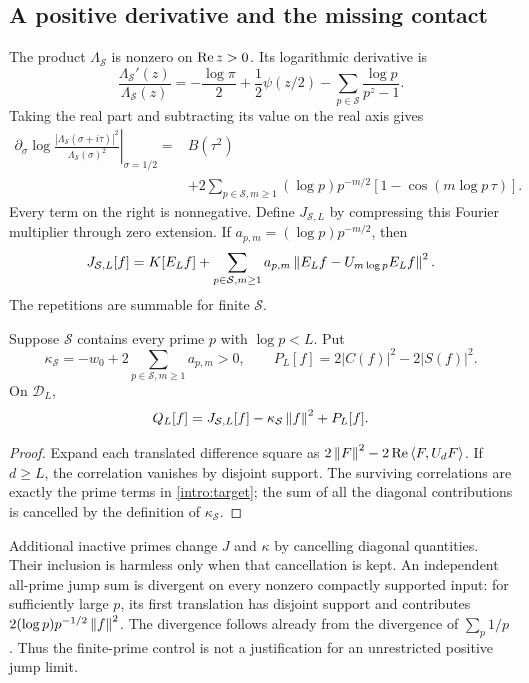 \subsection{A positive derivative and the missing contact}
The product $\Lambda_{\mathcal S}$ is nonzero on $\operatorname{Re} z>0$. Its logarithmic derivative is
\begin{equation}\label{ari:log-derivative}
\frac{\Lambda_{\mathcal S}'(z)}{\Lambda_{\mathcal S}(z)}
=-\frac{\log\pi}{2}+\frac12\psi(z/2)
-\sum_{p\in\mathcal S}\frac{\log p}{p^z-1}.
\end{equation}
Taking the real part and subtracting its value on the real axis gives
\begin{equation}\label{ari:positive-derivative}
\begin{split}
\left.\partial_\sigma\log
\frac{|\Lambda_{\mathcal S}(\sigma+i\tau)|^2}
{\Lambda_{\mathcal S}(\sigma)^2}\right|_{\sigma=1/2}
={}&B(\tau^2)\\
&+2\sum_{p\in\mathcal S,m\ge1}(\log p)p^{-m/2}
[1-\cos(m\log p\,\tau)].
\end{split}
\end{equation}
Every term on the right is nonnegative. Define $J_{\mathcal S,L}$ by compressing this Fourier multiplier through zero extension. If
$a_{p,m}=(\log p)p^{-m/2}$, then
\[
J_{\mathcal S,L}[f]=K[E_Lf]+
\sum_{p\in\mathcal S,m\ge1}a_{p,m}\left\lVert E_Lf-U_{m\log p}E_Lf\right\rVert^2.
\]
The repetitions are summable for finite $\mathcal S$.

\begin{proposition}\label{ari:contact}
Suppose $\mathcal S$ contains every prime $p$ with $\log p<L$. Put
\[
\kappa_{\mathcal S}=-w_0+2\sum_{p\in\mathcal S,m\ge1}a_{p,m}>0,
\qquad P_L[f]=2|C(f)|^2-2|S(f)|^2.
\]
On $\mathcal D_L$,
\begin{equation}\label{ari:contact-identity}
Q_L[f]=J_{\mathcal S,L}[f]-\kappa_{\mathcal S}\left\lVert f\right\rVert^2+P_L[f].
\end{equation}
\end{proposition}
\begin{proof}
Expand each translated difference square as
$2\left\lVert F\right\rVert^2-2\operatorname{Re}\left\langle F,U_dF\right\rangle$. If $d\ge L$, the correlation vanishes by disjoint support. The surviving correlations are exactly the prime terms in \eqref{intro:target}; the sum of all the diagonal contributions is cancelled by the definition of $\kappa_{\mathcal S}$.
\end{proof}
Additional inactive primes change $J$ and $\kappa$ by cancelling diagonal quantities. Their inclusion is harmless only when that cancellation is kept. An independent all-prime jump sum is divergent on every nonzero compactly supported input: for sufficiently large $p$, its first translation has disjoint support and contributes $2(\log p)p^{-1/2}\left\lVert f\right\rVert^2$. The divergence follows already from the divergence of $\sum_p1/p$. Thus the finite-prime control is not a justification for an unrestricted positive jump limit.

